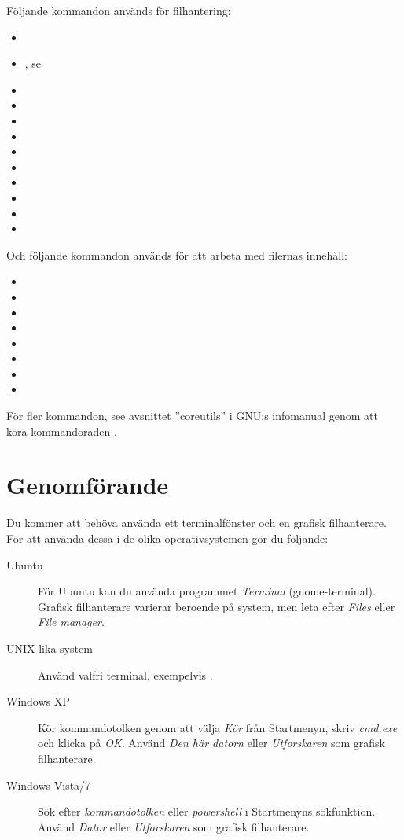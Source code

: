 \documentclass[a4paper]{miunasgn}
\begin{document}
Följande kommandon används för filhantering:
\begin{itemize}
  \item {}
  \item {}, se 
  \item {}
  \item {}
  \item {}
  \item {}
  \item {}
  \item {}
  \item {}
  \item {}
  \item {}
  \item {}
\end{itemize}

Och följande kommandon används för att arbeta med filernas innehåll:
\begin{itemize}
  \item {}
  \item {}
  \item {}
  \item {}
  \item {}
  \item {}
  \item {}
  \item {}
\end{itemize}

För fler kommandon, see avsnittet ''coreutils'' i GNU:s infomanual genom att 
köra kommandoraden .


\section{Genomförande}
\label{sec:Genomforande}
\noindent
Du kommer att behöva använda ett terminalfönster och en grafisk filhanterare.
För att använda dessa i de olika operativsystemen gör du följande:
\begin{description}
  \item[Ubuntu] För Ubuntu kan du använda programmet \emph{Terminal} 
    (gnome-terminal).
    Grafisk filhanterare varierar beroende på system, men leta efter 
    \emph{Files} eller \emph{File manager}.
  \item[UNIX-lika system] Använd valfri terminal, exempelvis .
  \item[Windows XP] Kör kommandotolken genom att välja \emph{Kör} från
    Startmenyn, skriv \emph{cmd.exe} och klicka på \emph{OK}.
    Använd \emph{Den här datorn} eller \emph{Utforskaren} som grafisk
    filhanterare.
  \item[Windows Vista/7] Sök efter \emph{kommandotolken} eller
    \emph{powershell} i Startmenyns sökfunktion.
    Använd \emph{Dator} eller \emph{Utforskaren} som grafisk filhanterare.
\end{description}
\end{document}
